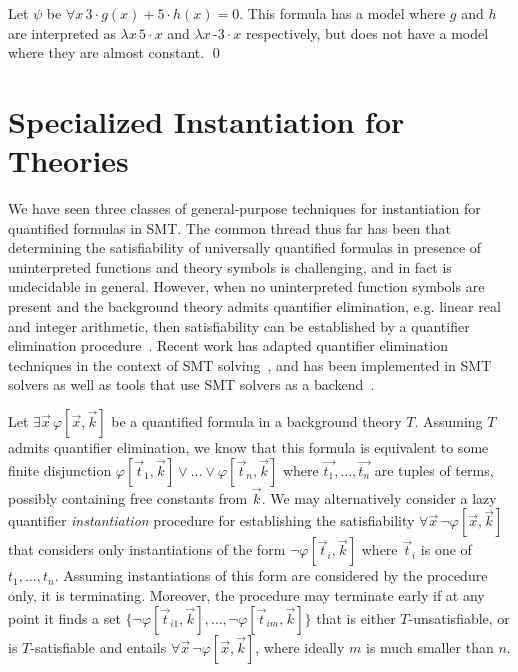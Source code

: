 \documentclass[oribibl]{llncs}
\begin{document}
\begin{example}
Let $\psi$ be $\forall x\, 3 \cdot g( x ) + 5 \cdot h( x ) = 0$.
This formula has a model where $g$ and $h$ are interpreted as $\lambda x\, 5 \cdot x$ and $\lambda x\, \text{-}3 \cdot x$ respectively,
but does not have a model where they are almost constant.
\qed
\end{example}


\section{Specialized Instantiation for Theories}
\label{sec:cegqi}

We have seen three classes of general-purpose techniques 
for instantiation for quantified formulas in SMT.
The common thread thus far has been that determining the satisfiability of universally quantified formulas in presence
of uninterpreted functions and theory symbols is challenging, and in fact is undecidable in general.
However, when no uninterpreted function symbols are present and the background theory admits quantifier elimination, 
e.g. linear real and integer arithmetic, then satisfiability 
can be established by a quantifier elimination procedure~\cite{cooper1972,FerranteRackoff79ComputationalComplexityLogicalTheories,Loos93applyinglinear}.
Recent work has adapted quantifier elimination techniques in the context of SMT solving~\cite{monniaux2010quantifier,ReynoldsDKBT15Cav,DBLP:conf/lpar/BjornerJ15},
and has been implemented in SMT solvers
as well as tools that use SMT solvers as a backend~\cite{komuravelli2014smt,DBLP:conf/lpar/FedyukovichGS15}.

Let $\exists \vec x\, \varphi[ \vec x, \vec k ]$ be a quantified formula in a background theory $T$.
Assuming $T$ admits quantifier elimination, we know that this formula is equivalent to some finite disjunction
$\varphi[ \vec t_1, \vec k ] \vee \ldots \vee \varphi[ \vec t_n, \vec k ]$ where $\vec{t_1}, \ldots, \vec{t_n}$ are tuples of terms, possibly containing free constants from $\vec k$.
We may alternatively consider a lazy quantifier \emph{instantiation} procedure for establishing the satisfiability 
$\forall \vec x\, \neg \varphi[ \vec x, \vec k ]$ that considers only instantiations of the form 
$\neg \varphi[ \vec t_i, \vec k ]$ where $\vec t_i$ is one of $t_1, \ldots, t_n$.
Assuming instantiations of this form are considered by the procedure only, it is terminating.
Moreover, the procedure may terminate early if at any point it finds a set
$\{ \neg \varphi[ \vec t_{i1}, \vec k ], \ldots, \neg \varphi[ \vec t_{im}, \vec k ] \}$ that is either
$T$-unsatisfiable, or is $T$-satisfiable and entails $\forall \vec x\, \neg \varphi[ \vec x, \vec k ]$,
where ideally $m$ is much smaller than $n$.
\end{document}
